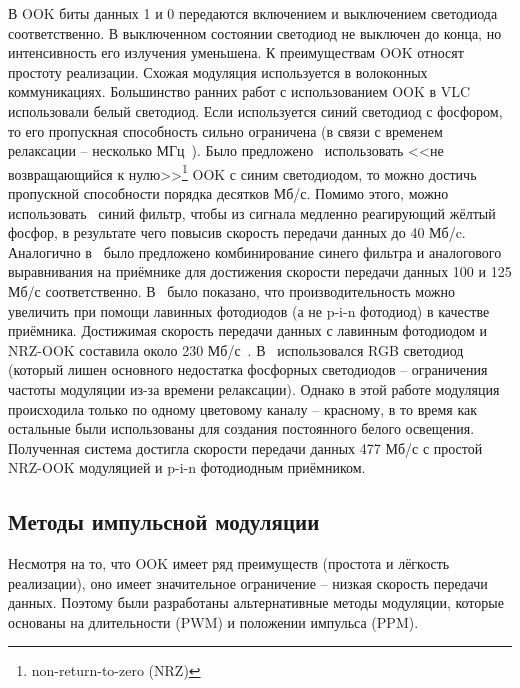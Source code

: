 В OOK биты данных 1 и 0 передаются включением и выключением светодиода соответственно. В выключенном состоянии светодиод не выключен до конца, но интенсивность его излучения уменьшена. К преимуществам OOK относят простоту реализации. Схожая модуляция используется в волоконных коммуникациях. Большинство ранних работ с использованием OOK в VLC использовали белый светодиод. Если используется синий светодиод с фосфором, то его пропускная способность сильно ограничена (в связи с временем релаксации \--- несколько МГц~\cite{Grubor2007}). Было предложено~\cite{Park2007} использовать <<не возвращающийся к нулю>>\footnote{non-return-to-zero (NRZ)} OOK с синим светодиодом, то можно достичь пропускной способности порядка десятков Мб/с. Помимо этого, можно использовать~\cite{Grubor2007} синий фильтр, чтобы из сигнала медленно реагирующий жёлтый фосфор, в результате чего повысив скорость передачи данных до 40 Мб/c. Аналогично в~\cite{Minh2008,Vucic2009} было предложено комбинирование синего фильтра и аналогового выравнивания на приёмнике для достижения скорости передачи данных 100 и 125 Мб/с соответственно. В~\cite{Vucic2010} было показано, что производительность можно увеличить при помощи лавинных фотодиодов (а не p-i-n фотодиод) в качестве приёмника. Достижимая скорость передачи данных с лавинным фотодиодом и NRZ-OOK составила около 230 Мб/с~\cite{Vucic2010}. В~\cite{Fujimoto2013} использовался RGB светодиод (который лишен основного недостатка фосфорных светодиодов \--- ограничения частоты модуляции из-за времени релаксации). Однако в этой работе модуляция происходила только по одному цветовому каналу \--- красному, в то время как остальные были использованы для создания постоянного белого освещения. Полученная система достигла скорости передачи данных 477 Мб/с с простой NRZ-OOK модуляцией и p-i-n фотодиодным приёмником. 

\subsection{Методы импульсной модуляции}


Несмотря на то, что OOK имеет ряд преимуществ (простота и лёгкость реализации), оно имеет значительное ограничение \--- низкая скорость передачи данных. Поэтому были разработаны альтернативные методы модуляции, которые основаны на длительности (PWM) и положении импульса (PPM). 


